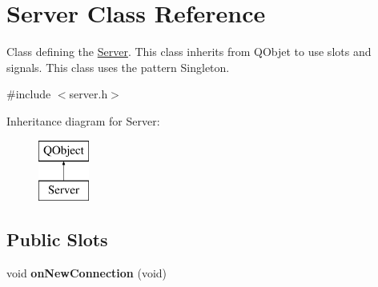 \hypertarget{class_server}{\section{Server Class Reference}
\label{class_server}
}


Class defining the \hyperlink{class_server}{Server}. This class inherits from Q\-Objet to use slots and signals. This class uses the pattern Singleton.  




{\ttfamily \#include $<$server.\-h$>$}

Inheritance diagram for Server\-:\begin{figure}[H]
\begin{center}
\leavevmode
\includegraphics[height=2.000000cm]{class_server}
\end{center}
\end{figure}
\subsection*{Public Slots}
\begin{DoxyCompactItemize}
\item 
\hypertarget{class_server_a2516adb58a24405e545f1750e8262a95}{void {\bfseries on\-New\-Connection} (void)}\label{class_server_a2516adb58a24405e545f1750e8262a95}

\end{DoxyCompactItemize}
